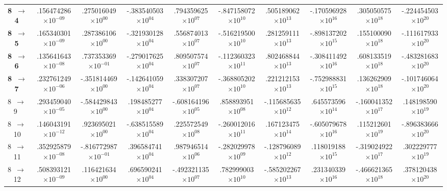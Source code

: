 \documentclass[reviewcopy]{elsarticle}
\begin{document}
\begin{landscape}
\begin{longtable}{lccccccccc}
{\bf 8~$\to$~ 4} &  .156474286$\times10^{-09}$ &   .275016049$\times10^{ 00}$ &  -.383540503$\times10^{ 04}$ &   .794359625$\times10^{ 07}$ &  -.847158072$\times10^{ 10}$ &   .505189062$\times10^{ 13}$ &  -.170596928$\times10^{ 16}$ &   .305050575$\times10^{ 18}$ &  -.224454503$\times10^{ 20}$ \\
{\bf 8~$\to$~ 5}  &  .165340301$\times10^{-09}$ &   .287386106$\times10^{ 00}$ &  -.321930128$\times10^{ 04}$ &   .556874013$\times10^{ 07}$ &  -.516219500$\times10^{ 10}$ &   .281259111$\times10^{ 13}$ &  -.898137202$\times10^{ 15}$ &   .155100090$\times10^{ 18}$ &  -.111617933$\times10^{ 20}$ \\
{\bf 8~$\to$~ 6}  &  .135641643$\times10^{-08}$ &   .737353369$\times10^{-01}$ &  -.279017625$\times10^{ 04}$ &   .809507574$\times10^{ 07}$ &  -.112360323$\times10^{ 11}$ &   .802468844$\times10^{ 13}$ &  -.308411492$\times10^{ 16}$ &   .608133519$\times10^{ 18}$ &  -.483281683$\times10^{ 20}$ \\
{\bf 8~$\to$~ 7}  &  .232761249$\times10^{-06}$ &  -.351814469$\times10^{ 00}$ &  -.142641059$\times10^{ 04}$ &   .338307207$\times10^{ 07}$ &  -.368805202$\times10^{ 10}$ &   .221212153$\times10^{ 13}$ &  -.752988831$\times10^{ 15}$ &   .136262909$\times10^{ 18}$ &  -.101746064$\times10^{ 20}$ \\
 8~$\to$~ 9  &  .293459040$\times10^{-05}$ &  -.584429843$\times10^{ 00}$ &   .198485277$\times10^{ 04}$ &  -.608164196$\times10^{ 05}$ &   .858893951$\times10^{ 08}$ &  -.115685635$\times10^{ 12}$ &   .645573596$\times10^{ 14}$ &  -.160041352$\times10^{ 17}$ &   .148198590$\times10^{ 19}$ \\
 8~$\to$~ 10 &  .146043191$\times10^{-12}$ &   .923695021$\times10^{ 00}$ &  -.638515589$\times10^{ 04}$ &   .225572549$\times10^{ 08}$ &  -.260012016$\times10^{ 11}$ &   .167123475$\times10^{ 14}$ &  -.605079678$\times10^{ 16}$ &   .115212601$\times10^{ 19}$ &  -.896383666$\times10^{ 20}$ \\
 8~$\to$~ 11 &  .352925879$\times10^{-08}$ &  -.816772987$\times10^{-01}$ &   .396584741$\times10^{ 04}$ &   .987946514$\times10^{ 06}$ &  -.282029978$\times10^{ 09}$ &  -.128796089$\times10^{ 12}$ &   .118019188$\times10^{ 15}$ &  -.319024922$\times10^{ 17}$ &   .302229777$\times10^{ 19}$ \\
 8~$\to$~ 12 &  .508393121$\times10^{-09}$ &   .116421634$\times10^{ 00}$ &   .696590241$\times10^{ 04}$ &  -.492321135$\times10^{ 07}$ &   .782999003$\times10^{ 10}$ &  -.585202267$\times10^{ 13}$ &   .231340339$\times10^{ 16}$ &  -.466621365$\times10^{ 18}$ &   .378120438$\times10^{ 20}$ \\

\end{longtable}
\end{landscape}
\end{document}
